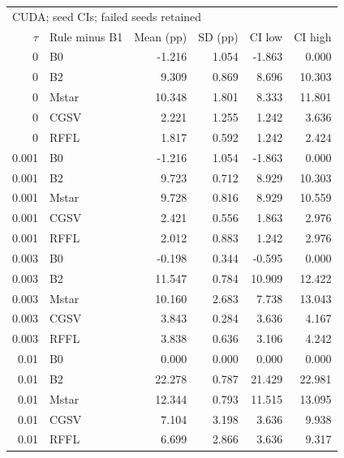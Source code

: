 \begin{tabular}{rlrrrr}
\toprule
\multicolumn{6}{l}{CUDA; seed CIs; failed seeds retained} \\
$\tau$ & Rule minus B1 & Mean (pp) & SD (pp) & CI low & CI high \\
\midrule
0 & B0 & -1.216 & 1.054 & -1.863 & 0.000 \\
0 & B2 & 9.309 & 0.869 & 8.696 & 10.303 \\
0 & Mstar & 10.348 & 1.801 & 8.333 & 11.801 \\
0 & CGSV & 2.221 & 1.255 & 1.242 & 3.636 \\
0 & RFFL & 1.817 & 0.592 & 1.242 & 2.424 \\
0.001 & B0 & -1.216 & 1.054 & -1.863 & 0.000 \\
0.001 & B2 & 9.723 & 0.712 & 8.929 & 10.303 \\
0.001 & Mstar & 9.728 & 0.816 & 8.929 & 10.559 \\
0.001 & CGSV & 2.421 & 0.556 & 1.863 & 2.976 \\
0.001 & RFFL & 2.012 & 0.883 & 1.242 & 2.976 \\
0.003 & B0 & -0.198 & 0.344 & -0.595 & 0.000 \\
0.003 & B2 & 11.547 & 0.784 & 10.909 & 12.422 \\
0.003 & Mstar & 10.160 & 2.683 & 7.738 & 13.043 \\
0.003 & CGSV & 3.843 & 0.284 & 3.636 & 4.167 \\
0.003 & RFFL & 3.838 & 0.636 & 3.106 & 4.242 \\
0.01 & B0 & 0.000 & 0.000 & 0.000 & 0.000 \\
0.01 & B2 & 22.278 & 0.787 & 21.429 & 22.981 \\
0.01 & Mstar & 12.344 & 0.793 & 11.515 & 13.095 \\
0.01 & CGSV & 7.104 & 3.198 & 3.636 & 9.938 \\
0.01 & RFFL & 6.699 & 2.866 & 3.636 & 9.317 \\
\bottomrule
\end{tabular}

